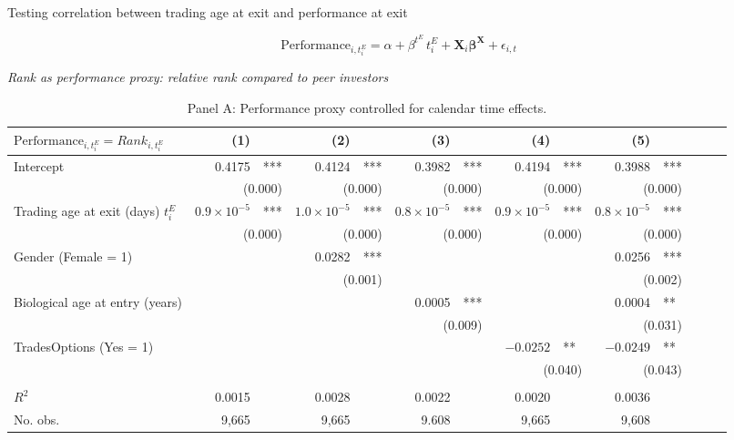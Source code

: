 \documentclass{beamer}
\begin{document}
\begin{frame}{Testing correlation between trading age at exit and performance at exit}

$$
\text{Performance}_{i, t^E_i} = \alpha + \beta^{t^E} \, t^E_i + \bm{X}_i \bm{\beta}^{\bm{X}} + \epsilon_{i,t}
$$

{\em Rank as performance proxy: relative rank compared to peer investors}

\begin{table}[h!]
	\centering
	\caption{Panel A: Performance proxy controlled for calendar time effects.}
	\setlength{\tabcolsep}{3pt}
	\tiny
	\begin{tabular}{@{}l@{}r@{}lr@{}lr@{}lr@{}lr@{}lr@{}l@{}l}
		\toprule
		$\text{Performance}_{i, t^E_i}  = Rank_{i,t^E_i}$		& (1)   &       & (2)   &       & (3)   &       & (4)   &       & (5)   &  \\
		\midrule
		Intercept & 0.4175 & ***   & 0.4124 & ***   & 0.3982 & ***   & 0.4194 & ***   & 0.3988 & *** \\
		& \multicolumn{2}{r}{(0.000)} & \multicolumn{2}{r}{(0.000)} & \multicolumn{2}{r}{(0.000)} & \multicolumn{2}{r}{(0.000)} & \multicolumn{2}{r}{(0.000)} \\
		Trading age at exit (days) $t^E_i$ & $0.9\times 10^{-5}$  & ***   & $1.0 \times 10^{-5}$  & ***   & $0.8\times 10^{-5}$  & ***   & $0.9\times 10^{-5}$  & ***   & $0.8\times 10^{-5}$  & *** \\
		& \multicolumn{2}{r}{(0.000)} & \multicolumn{2}{r}{(0.000)} & \multicolumn{2}{r}{(0.000)} & \multicolumn{2}{r}{(0.000)} & \multicolumn{2}{r}{(0.000)} \\
		Gender (Female = 1) &       &       & 0.0282 & ***   &       &       &       &       & 0.0256 & *** \\
		& \multicolumn{2}{r}{} & \multicolumn{2}{r}{(0.001)} & \multicolumn{2}{r}{} & \multicolumn{2}{r}{} & \multicolumn{2}{r}{(0.002)} \\
		Biological age at entry (years) &       &       &       &       & 0.0005 & ***   &       &       & 0.0004 & ** \\
		& \multicolumn{2}{r}{} & \multicolumn{2}{r}{} & \multicolumn{2}{r}{(0.009)} & \multicolumn{2}{r}{} & \multicolumn{2}{r}{(0.031)} \\
		TradesOptions (Yes = 1) &       &       &       &       &       &       & $-0.0252$ & **    & $-0.0249$ & ** \\
		& \multicolumn{2}{r}{} & \multicolumn{2}{r}{} & \multicolumn{2}{r}{} & \multicolumn{2}{r}{(0.040)} & \multicolumn{2}{r}{(0.043)} \\
		&       &       &       &       &       &       &       &       &       &  \\
		$R^2$  & 0.0015 &       & 0.0028 &       & 0.0022 &       & 0.0020 &       & 0.0036 &  \\
		No. obs.   & 9,665  &       & 9,665  &       & 9.608  &       & 9,665  &       & 9,608  &  \\
		\bottomrule
	\end{tabular}
	\label{tab:ols}
\end{table}

\end{frame}
\end{document}

